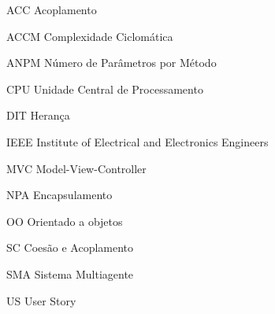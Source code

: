 \begin{siglas}

\item [ACC] Acoplamento
\item [ACCM] Complexidade Ciclomática
\item [ANPM] Número de Parâmetros por Método
\item [CPU] Unidade Central de Processamento
\item [DIT] Herança
\item [IEEE] Institute of Electrical and Electronics Engineers
\item [MVC] Model-View-Controller
\item [NPA] Encapsulamento
\item [OO] Orientado a objetos
\item [SC] Coesão e Acoplamento
\item [SMA] Sistema Multiagente
\item [US] User Story
\end{siglas}
